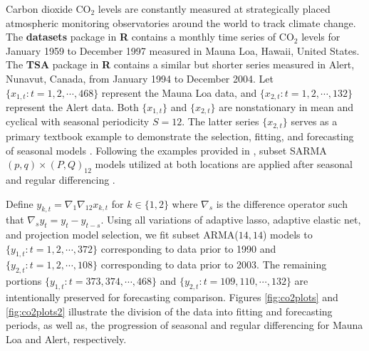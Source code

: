 Carbon dioxide $\textrm{CO}_2$ levels are constantly measured at strategically placed atmospheric monitoring observatories around the world to track climate change. The {\bf datasets} package in {\bf R} \citep{RCORETEAM} contains a monthly time series of  $\textrm{CO}_2$ levels for January 1959 to December 1997 measured in Mauna Loa, Hawaii, United States. The {\bf TSA} package in {\bf R} \citep{RTSA} contains a similar but shorter series  measured  in Alert, Nunavut, Canada, from January 1994 to December 2004. Let $\{x_{1,t}:t=1,2,\cdots,468\}$ represent the Mauna Loa data, and $\{x_{2,t}:t=1,2,\cdots,132\}$ represent the Alert data. Both $\{x_{1,t}\}$ and $\{x_{2,t}\}$ are nonstationary in mean and cyclical with seasonal periodicity $S=12$. The latter series $\{x_{2,t}\}$ serves as a primary textbook example  to demonstrate the selection, fitting, and forecasting of seasonal models \citep{Cryer2008}. Following the examples provided in \cite{Cryer2008,Chen2011}, subset SARMA$(p,q)\times(P,Q)_{12}$ models utilized at both locations are applied after seasonal and regular differencing . 

Define $y_{k,t}=\nabla_1\nabla_{12}x_{k,t}$ for $k\in\{1,2\}$  where $\nabla_s$ is the difference operator such that $\nabla_s y_t=y_t-y_{t-s}$.  Using all variations of adaptive lasso, adaptive elastic net, and projection model selection, we fit subset ARMA($14,14$) models to $\{y_{1,t}:t=1,2,\cdots,372\}$ corresponding to data prior to 1990 and $\{y_{2,t}:t=1,2,\cdots,108\}$ corresponding to data prior to 2003. The remaining portions $\{y_{1,t}:t=373,374,\cdots,468\}$ and $\{y_{2,t}:t=109,110,\cdots,132\}$ are intentionally preserved for forecasting comparison. Figures \ref{fig:co2plots} and \ref{fig:co2plots2} illustrate the division of the data into fitting and forecasting periods, as well as, the progression of seasonal and regular differencing for Mauna Loa and Alert, respectively.

